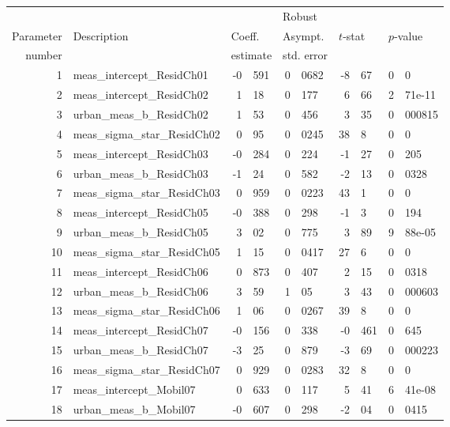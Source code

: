 \documentclass[12pt,a4paper]{article}
\begin{document}
\begin{table}[htb]
    \footnotesize
  \begin{center}
\begin{tabular}{rlr@{.}lr@{.}lr@{.}lr@{.}l}
  &              &   \multicolumn{2}{l}{}         & \multicolumn{2}{l}{Robust}  &  \multicolumn{4}{l}{}  \\
  Parameter & Description & \multicolumn{2}{l}{Coeff.} & \multicolumn{2}{l}{Asympt.} & \multicolumn{2}{l}{$t$-stat} & \multicolumn{2}{l}{$p$-value} \\
  number    &             & \multicolumn{2}{l}{estimate} & \multicolumn{2}{l}{std. error} & \multicolumn{2}{l}{} & \multicolumn{2}{l}{} \\
  \hline
1 & meas\_intercept\_ResidCh01 & -0&591 & 0&0682 & -8&67 & 0&0 \\ 
2 & meas\_intercept\_ResidCh02 & 1&18 & 0&177 & 6&66 & 2&71e-11 \\ 
3 & urban\_meas\_b\_ResidCh02 & 1&53 & 0&456 & 3&35 & 0&000815 \\ 
4 & meas\_sigma\_star\_ResidCh02 & 0&95 & 0&0245 & 38&8 & 0&0 \\ 
5 & meas\_intercept\_ResidCh03 & -0&284 & 0&224 & -1&27 & 0&205 \\ 
6 & urban\_meas\_b\_ResidCh03 & -1&24 & 0&582 & -2&13 & 0&0328 \\ 
7 & meas\_sigma\_star\_ResidCh03 & 0&959 & 0&0223 & 43&1 & 0&0 \\ 
8 & meas\_intercept\_ResidCh05 & -0&388 & 0&298 & -1&3 & 0&194 \\ 
9 & urban\_meas\_b\_ResidCh05 & 3&02 & 0&775 & 3&89 & 9&88e-05 \\ 
10 & meas\_sigma\_star\_ResidCh05 & 1&15 & 0&0417 & 27&6 & 0&0 \\ 
11 & meas\_intercept\_ResidCh06 & 0&873 & 0&407 & 2&15 & 0&0318 \\ 
12 & urban\_meas\_b\_ResidCh06 & 3&59 & 1&05 & 3&43 & 0&000603 \\ 
13 & meas\_sigma\_star\_ResidCh06 & 1&06 & 0&0267 & 39&8 & 0&0 \\ 
14 & meas\_intercept\_ResidCh07 & -0&156 & 0&338 & -0&461 & 0&645 \\ 
15 & urban\_meas\_b\_ResidCh07 & -3&25 & 0&879 & -3&69 & 0&000223 \\ 
16 & meas\_sigma\_star\_ResidCh07 & 0&929 & 0&0283 & 32&8 & 0&0 \\ 
17 & meas\_intercept\_Mobil07 & 0&633 & 0&117 & 5&41 & 6&41e-08 \\ 
18 & urban\_meas\_b\_Mobil07 & -0&607 & 0&298 & -2&04 & 0&0415 \\ 

\end{tabular}
\end{center}
\end{table}
\end{document}
